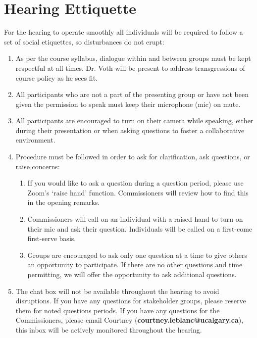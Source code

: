\documentclass[12pt, letterpaper]{article}
\begin{document}
\section*{\normalfont\normalsize\bf Hearing Ettiquette}
\noindent For the hearing to operate smoothly all individuals will be required
to follow a set of social etiquettes, so disturbances do not erupt:
\begin{enumerate}[label={\bf\arabic*}.]
  \item As per the course syllabus, dialogue within and between groups must be
    kept respectful at all times.
    Dr. Voth will be present to address transgressions of course policy as he
    sees fit.
  \item All participants who are not a part of the presenting group or have not
    been given the permission to speak must keep their microphone (mic) on mute.
  \item All participants are encouraged to turn on their camera while speaking,
    either during their presentation or when asking questions to foster a
    collaborative environment.
  \item Procedure must be followed in order to ask for clarification,  ask
    questions, or raise concerns:
    \begin{enumerate}[label={\bf\alph*}.]
      \item If you would like to ask a question during a question period, please use
        Zoom’s ‘raise hand’ function. Commissioners will review how to find this in
        the opening remarks.
      \item Commissioners will call on an individual with a raised hand to turn on
        their mic and ask their question. Individuals will be called on a
        first-come first-serve basis.
      \item Groups are encouraged to ask only one question at a time to give
        others an opportunity to participate. If there are no other questions and
        time permitting, we will offer the opportunity to ask additional questions.
    \end{enumerate}
  \item  The chat box will not be available throughout the hearing to avoid
    disruptions. If you have any questions for stakeholder groups, please
    reserve them for noted questions periods. If you have any questions for the
    Commissioners, please email Courtney ({\bf courtney.leblanc@ucalgary.ca}), this
    inbox will be actively monitored throughout the hearing.
\end{enumerate}
\end{document}
